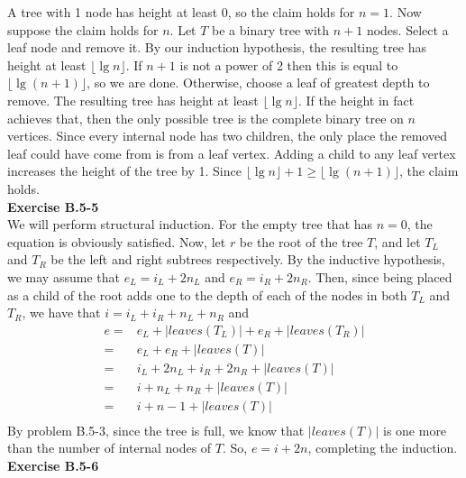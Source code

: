 \documentclass{article}
\begin{document}
A tree with 1 node has height at least 0, so the claim holds for $n=1$.  Now suppose the claim holds for $n$.  Let $T$ be a binary tree with $n+1$ nodes.  Select a leaf node and remove it. By our induction hypothesis, the resulting tree has height at least $\lfloor \lg n \rfloor$. If $n+1$ is not a power of 2 then this is equal to $\lfloor \lg(n+1) \rfloor$, so we are done.  Otherwise, choose a leaf of greatest depth to remove.  The resulting tree has height at least $\lfloor \lg n \rfloor$.  If the height in fact achieves that, then the only possible tree is the complete binary tree on $n$ vertices.  Since every internal node has two children, the only place the removed leaf could have come from is from a leaf vertex.  Adding a child to any leaf vertex increases the height of the tree by 1.  Since $\lfloor \lg n\rfloor + 1 \geq \lfloor \lg(n+1) \rfloor$, the claim holds. \\

\noindent\textbf{Exercise B.5-5}\\
We will perform structural induction. For the empty tree that has $n=0$, the equation is obviously satisfied. Now, let $r$ be the root of the tree $T$, and let $T_L$ and $T_R$ be the left and right subtrees respectively. By the inductive hypothesis, we may assume that $e_L = i_L + 2n_L$ and $e_R = i_R + 2 n_R$. Then, since being placed as a child of the root adds one to the depth of each of the nodes in both $T_L$ and $T_R$, we have that $i = i_L + i_R + n_L+n_R$ and 
\begin{align*}
e =& e_L + |leaves(T_L)| + e_R +|leaves(T_R)| \\
=& e_L + e_R + |leaves(T)| \\
=& i_L + 2 n_L + i_R + 2n_R + |leaves(T)| \\
=& i + n_L + n_R + |leaves(T)| \\
=& i + n-1 + |leaves(T)| \\
\end{align*}
 By problem B.5-3, since the tree is full, we know that $|leaves(T)|$ is one more than the number of internal nodes of $T$. So, $e =  i+ 2n$, completing the induction.\\

\noindent\textbf{Exercise B.5-6}\\
\end{document}
